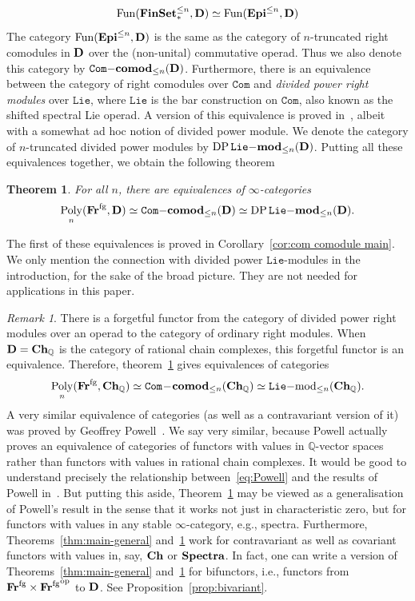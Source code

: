 \documentclass[psamsfonts]{amsart}
\theoremstyle{plain}
\newtheorem{mainthm}{Theorem}
\theoremstyle{definition}
\theoremstyle{remark}
\newtheorem{rem}[thm]{Remark}
\newcommand{\Q}{\mathbb{Q}}
\newcommand{\catname}[1]{{\normalfont\textbf{#1}}}
\newcommand{\op}{{\mathrm{op}}}
\newcommand{\finset}{\catname{FinSet}_*}
\newcommand{\epi}{\catname{Epi}}
\newcommand{\fr}{\allfr^{\mathrm{fg}}}
\newcommand{\allfr}{\catname{Fr}}
\newcommand{\ch}{\catname{Ch}}
\newcommand{\comod}{\catname{comod}}
\newcommand{\DP}{\operatorname{DP}}
\newcommand{\module}{\catname{mod}}
\newcommand{\com}{\mathtt{Com}}
\newcommand{\Lie}{\mathtt{Lie}}
\DeclareMathOperator{\fun}{Fun}
\DeclareMathOperator{\poly}{Poly}
\begin{document}
\[
\fun(\finset^{\le n}, \catname{D})\simeq \fun(\epi^{\le n}, \catname{D})
\]
The category $\fun(\epi^{\le n}, \catname{D})$ is the same as the category of $n$-truncated right comodules in $\catname{D}$ over the (non-unital) commutative operad. Thus we also denote this category by $\com\mathrm{-}\comod_{\le n}(\catname{D})$. Furthermore, there is an equivalence between the category of right comodules over $\com$ and \emph{divided power right modules} over $\Lie$, where $\Lie$ is the bar construction on $\com$, also known as the shifted spectral Lie operad. A version of this equivalence is proved in~\cite[Theorem 3.82]{Arone-Ching_Cross-effects}, albeit with a somewhat ad hoc notion of divided power module. We denote the category of $n$-truncated divided power modules by $\DP\Lie\mathrm{-}\module_{\le n}(\catname{D})$. Putting all these equivalences together, we obtain the  following theorem
\begin{mainthm}\label{mainthm-modules}
For all $n$, there are equivalences of $\infty$-categories
\[
\poly_n(\fr, \catname{D})\simeq \com\mathrm{-}\comod_{\le n}(\catname{D}) \simeq \DP\Lie\mathrm{-}\module_{\le n}(\catname{D}).
\]
\end{mainthm}
The first of these equivalences is proved in Corollary~\ref{cor:com comodule main}. We only mention the connection with divided power $\Lie$-modules in the introduction, for the sake of the broad picture. They are not needed for applications in this paper.
\begin{rem}
There is a forgetful functor from the category of divided power right modules over an operad to the category of ordinary right modules. When $\catname{D}=\ch_{\Q}$ is the category of rational chain complexes, this forgetful functor is an equivalence. Therefore, theorem~\ref{mainthm-modules} gives equivalences of categories
\begin{equation}\label{eq:Powell}
\poly_n({\fr}, \ch_{\Q})\simeq \com\!-\!\comod_{\le n}(\ch_{\Q}) \simeq \Lie\mathrm{-mod}_{\le n}(\ch_\Q).
\end{equation}
A very similar equivalence of categories (as well as a contravariant version of it) was proved by Geoffrey Powell~\cite{Powell_analytic}. We say very similar, because Powell actually proves an equivalence of categories of functors with values in $\Q$-vector spaces rather than functors with values in rational chain complexes. It would be good to understand precisely the relationship between~\eqref{eq:Powell} and the results of Powell in~\cite{Powell_analytic}. But putting this aside, Theorem~\ref{mainthm-modules} may be viewed as a generalisation of Powell's result in the sense that it works not just in characteristic zero, but for functors with values in any stable $\infty$-category, e.g., spectra. Furthermore, Theorems~\ref{thm:main-general} and~\ref{mainthm-modules} work for contravariant as well as covariant functors with values in, say, $\ch$ or $\catname{Spectra}$. In fact, one can write a version of Theorems~\ref{thm:main-general} and~\ref{mainthm-modules} for bifunctors, i.e., functors from $\fr\times{\fr}^{\op}$ to $\catname{D}$. See Proposition~\ref{prop:bivariant}.
\end{rem}
\end{document}
